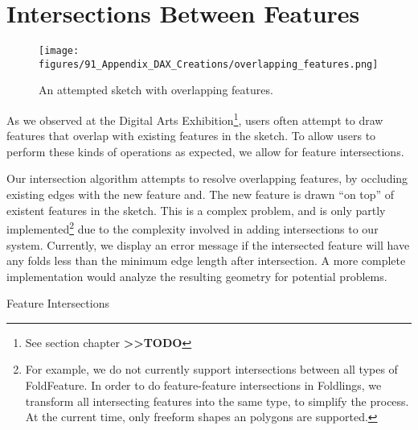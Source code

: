 \section{Intersections Between
Features}\label{intersections-between-features}

\begin{figure}[htbp]
\centering
\texttt{[image: figures/91\_Appendix\_DAX\_Creations/overlapping\_features.png]}
\caption{An attempted sketch with overlapping features.}
\end{figure}

As we observed at the Digital Arts Exhibition\footnote{See section
  chapter \textbf{\textgreater{}\textgreater{}TODO}}, users often
attempt to draw features that overlap with existing features in the
sketch. To allow users to perform these kinds of operations as expected,
we allow for feature intersections.

Our intersection algorithm attempts to resolve overlapping features, by
occluding existing edges with the new feature and. The new feature is
drawn ``on top'' of existent features in the sketch. This is a complex
problem, and is only partly implemented\footnote{For example, we do not
  currently support intersections between all types of FoldFeature. In
  order to do feature-feature intersections in Foldlings, we transform
  all intersecting features into the same type, to simplify the process.
  At the current time, only freeform shapes an polygons are supported.}
due to the complexity involved in adding intersections to our system.
Currently, we display an error message if the intersected feature will
have any folds less than the minimum edge length after intersection. A
more complete implementation would analyze the resulting geometry for
potential problems.

\begin{algorithm}[H]
\caption{Feature Intersections}
\end{algorithm}
